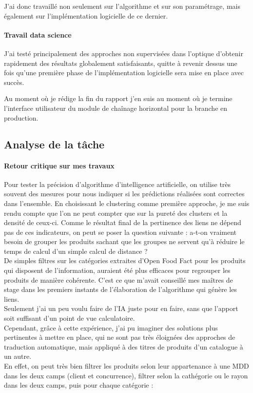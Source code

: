 \documentclass{rapportCS}
\begin{document}
J'ai donc travaillé non seulement sur l'algorithme et sur son paramétrage,
mais également sur l'implémentation logicielle de ce dernier.

\paragraph{Travail data science}
J'ai testé principalement des approches non supervisées dans l'optique d'obtenir rapidement des résultats 
globalement satisfaisants, quitte à revenir dessus une fois qu'une première phase
de l'implémentation logicielle sera mise en place avec succès.

Au moment où je rédige la fin du rapport j'en suis au moment où je termine l'interface
utilisateur du module de chaînage horizontal pour la branche en production.


\subsection{Analyse de la tâche}

\paragraph{Retour critique sur mes travaux}

Pour tester la précision d'algorithme d'intelligence artificielle, on utilise très souvent des mesures pour
nous indiquer si les prédictions réalisées sont correctes dans l'ensemble. En choisissant le clustering
comme première approche, je me suis rendu compte que l'on ne peut compter que sur la pureté des clusters
et la densité de ceux-ci.
Comme le résultat final de la pertinence des liens ne dépend pas de ces indicateurs, on peut se poser la question
suivante : a-t-on vraiment besoin de grouper les produits sachant que les groupes ne servent qu'à réduire
le temps de calcul d'un simple calcul de distance ?\\

De simples filtres sur les catégories extraites d'Open Food Fact pour les produits qui disposent de l'information,
auraient été plus efficaces pour regrouper les produits de manière cohérente. C'est ce que m'avait conseillé mes
maîtres de stage dans les premiers instants de l'élaboration de l'algorithme qui génère les liens.\\

Seulement j'ai un peu voulu faire de l'IA juste pour en faire, sans que l'apport soit suffisant d'un point 
de vue calculatoire.\\
Cependant, grâce à cette expérience, j'ai pu imaginer des solutions plus pertinentes à mettre en place,
qui ne sont pas très éloignées des approches de traduction automatique, mais appliqué à des titres de produits d'un catalogue
à un autre.\\
En effet, on peut très bien filtrer les produits selon leur appartenance à une MDD dans les deux camps (client et concurrence),
filtrer selon la cathégorie ou le rayon dans les deux camps, puis pour chaque catégorie :\\
\end{document}
